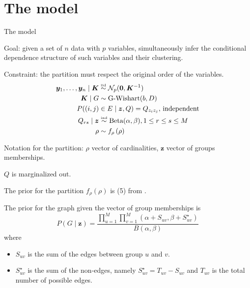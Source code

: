 
\section{The model}

\begin{frame}{The model}

\alert{Goal}: given a set of $n$ data with $p$ variables, simultaneously infer the conditional dependence structure of such variables and their clustering.

\pause

\alert{Constraint}: the partition must respect the original order of the variables.
\pause
\begin{align*}
    \bm{y}_1, \ldots, \bm{y}_n \mid \bm{K} & \overset{\text{\tiny{iid}}}{\sim} \mathcal{N}_p(\mathbf{0}, \bm{K}^{-1} ) \\
    \bm{K} \mid G & \sim \operatorname{G-Wishart}(b, D)\\
    P((i,j)&\in E\mid \bm{z},Q) = Q_{z_{i} z_{j}},\,\text{independent}\\
        Q_{rs} \mid \bm{z} &\overset{\text{\tiny{ind}}}{\sim} \operatorname{Beta}(\alpha,\beta), 1\leq r\leq s\leq M\\
    \rho & \sim f_{\rho} \left(\rho\right)
\end{align*}

Notation for the partition: $\rho$ vector of cardinalities, $\bm{z}$ vector of groups memberships.

\end{frame}

\begin{frame}

$Q$ is marginalized out.
\pause

The prior for the \alert{partition} $f_{\rho}(\rho)$ is (5) from \cite{martinezNonparametricChangePoint2014}.

The prior for the \alert{graph} given the vector of group memberships is
$$P(G\mid \bm{z})= \frac {\prod_{u=1}^{M}\prod_{v=1}^{M}(\alpha + S_{uv}, \beta+ S^{\star}_{uv})}{B(\alpha,\beta)}$$
where 
\begin{itemize}
    \item $S_{uv}$ is the sum of the edges between group $u$ and $v$.
    \item $S^{\star}_{uv}$ is the sum of the non-edges, namely $S^{\star}_{uv} = T_{uv} - S_{uv}$ and $T_{uv}$ is the total number of possible edges.
\end{itemize}
\pause


\end{frame}

